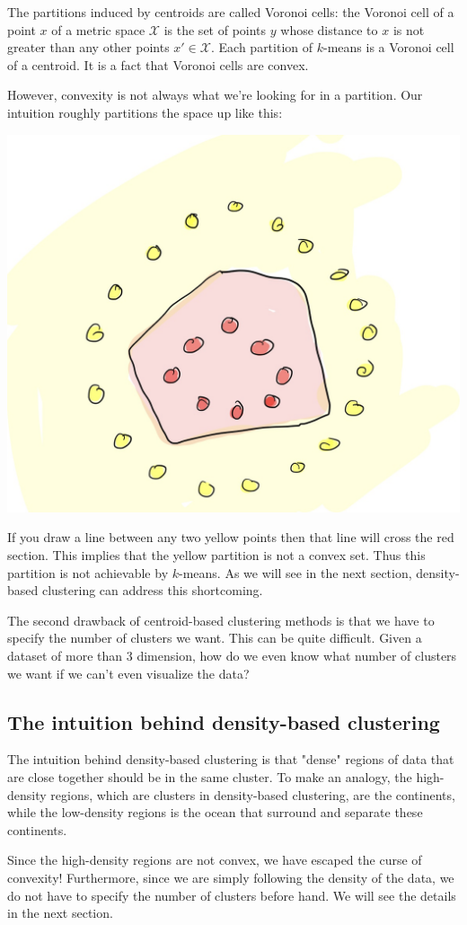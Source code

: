 The partitions induced by centroids are called Voronoi cells: the Voronoi
cell of a point $x$ of a metric space $\mathcal{X}$ is the set of points
$y$ whose distance to $x$ is not greater than any other points $x' \in \mathcal{X}$.
Each partition of $k$-means is a Voronoi cell of a centroid. It is a fact that
Voronoi cells are convex.

However, convexity is not always what we're looking for in a partition. Our intuition
roughly partitions the space up like this:

\begin{center}
\includegraphics[width=.7\linewidth]{chapter_2/images/intuition-cell.jpg}
\end{center}

If you draw a line between any two yellow points then that line will
cross the red section. This implies that the yellow partition is not a convex
set. Thus this partition is not achievable by $k$-means. As we will see
in the next section, density-based clustering can address this shortcoming.

The second drawback of centroid-based clustering methods is that we have
to specify the number of clusters we want. This can be quite difficult. Given
a dataset of more than 3 dimension, how do we even know what number of clusters
we want if we can't even visualize the data?

\subsection{The intuition behind density-based clustering}

The intuition behind density-based clustering is that "dense" regions of data
that are close together should be in the same cluster. To make an analogy,
the high-density regions, which are clusters in density-based clustering, are the continents,
while the low-density regions is the ocean that surround and separate these
continents.

Since the high-density regions are not convex, we have escaped the curse of
convexity! Furthermore, since we are simply following the density of the data,
we do not have to specify the number of clusters before hand. We will see the
details in the next section.
